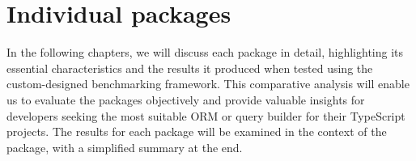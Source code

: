 \chapter{Individual packages}

In the following chapters, we will discuss each package in detail, highlighting
its essential characteristics and the results it produced when tested using the
custom-designed benchmarking framework. This comparative analysis will enable us
to evaluate the packages objectively and provide valuable insights for
developers seeking the most suitable ORM or query builder for their TypeScript
projects. The results for each package will be examined in the context of the
package, with a simplified summary at the end.